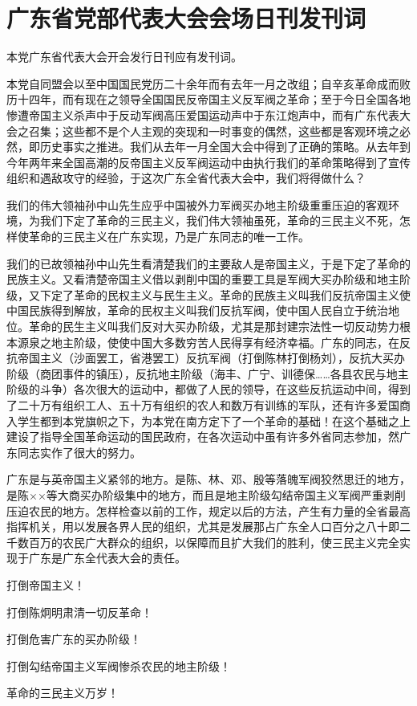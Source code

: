 \section[广东省党部代表大会会场日刊发刊词（一九二五年十月二十五日）]{广东省党部代表大会会场日刊发刊词}


本党广东省代表大会开会发行日刊应有发刊词。

本党自同盟会以至中国国民党历二十余年而有去年一月之改组；自辛亥革命成而败历十四年，而有现在之领导全国国民反帝国主义反军阀之革命；至于今日全国各地惨遭帝国主义杀声中于反动军阀高压爱国运动声中于东江炮声中，而有广东代表大会之召集；这些都不是个人主观的突现和一时事变的偶然，这些都是客观环境之必然，即历史事实之推进。我们从去年一月全国大会中得到了正确的策略。从去年到今年两年来全国高潮的反帝国主义反军阀运动中由执行我们的革命策略得到了宣传组织和遇敌攻守的经验，于这次广东全省代表大会中，我们将得做什么？

我们的伟大领袖孙中山先生应乎中国被外力军阀买办地主阶级重重压迫的客观环境，为我们下定了革命的三民主义，我们伟大领袖虽死，革命的三民主义不死，怎样使革命的三民主义在广东实现，乃是广东同志的唯一工作。

我们的已故领袖孙中山先生看清楚我们的主要敌人是帝国主义，于是下定了革命的民族主义。又看清楚帝国主义借以剥削中国的重要工具是军阀大买办阶级和地主阶级，又下定了革命的民权主义与民生主义。革命的民族主义叫我们反抗帝国主义使中国民族得到解放，革命的民权主义叫我们反抗军阀，使中国人民自立于统治地位。革命的民生主义叫我们反对大买办阶级，尤其是那封建宗法性一切反动势力根本源泉之地主阶级，使使中国大多数穷苦人民得享有经济幸福。广东的同志，在反抗帝国主义（沙面罢工，省港罢工）反抗军阀（打倒陈林打倒杨刘），反抗大买办阶级（商团事件的镇压），反抗地主阶级（海丰、广宁、训德保……各县农民与地主阶级的斗争）各次很大的运动中，都做了人民的领导，在这些反抗运动中间，得到了二十万有组织工人、五十万有组织的农人和数万有训练的军队，还有许多爱国商入学生都到本党旗帜之下，为本党在南方定下了一个革命的基础！在这个基础之上建设了指导全国革命运动的国民政府，在各次运动中虽有许多外省同志参加，然广东同志实作了很大的努力。

广东是与英帝国主义紧邻的地方。是陈、林、邓、殷等落魄军阀狡然思迁的地方，是陈××等大商买办阶级集中的地方，而且是地主阶级勾结帝国主义军阀严重剥削压迫农民的地方。怎样检查以前的工作，规定以后的方法，产生有力量的全省最高指挥机关，用以发展各界人民的组织，尤其是发展那占广东全人口百分之八十即二千数百万的农民广大群众的组织，以保障而且扩大我们的胜利，使三民主义完全实现于广东是广东全代表大会的责任。

打倒帝国主义！

打倒陈炯明肃清一切反革命！

打倒危害广东的买办阶级！

打倒勾结帝国主义军阀惨杀农民的地主阶级！

革命的三民主义万岁！

